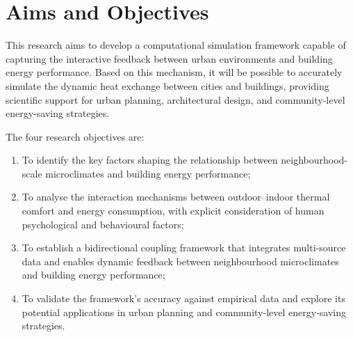 \section{Aims and Objectives}

This research aims to develop a computational simulation framework capable of capturing the interactive feedback between urban environments and building energy performance. Based on this mechanism, it will be possible to accurately simulate the dynamic heat exchange between cities and buildings, providing scientific support for urban planning, architectural design, and community-level energy-saving strategies.

The four research objectives are:

\begin{enumerate}[label=\arabic*)]
    \item To identify the key factors shaping the relationship between neighbourhood-scale microclimates and building energy performance;
    \item To analyse the interaction mechanisms between outdoor--indoor thermal comfort and energy consumption, with explicit consideration of human psychological and behavioural factors;
    \item To establish a bidirectional coupling framework that integrates multi-source data and enables dynamic feedback between neighbourhood microclimates and building energy performance;
    \item To validate the framework's accuracy against empirical data and explore its potential applications in urban planning and community-level energy-saving strategies.
\end{enumerate}
